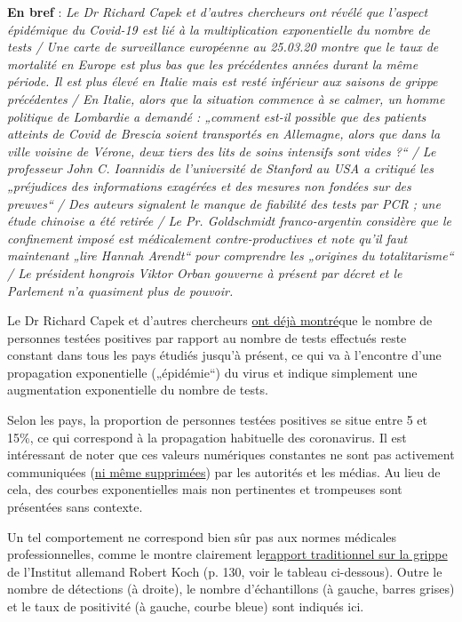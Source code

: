 \textbf{En bref} : \emph{Le Dr Richard Capek et d'autres chercheurs ont
révélé que l'aspect épidémique du Covid-19 est lié à la multiplication
exponentielle du nombre de tests / Une carte de surveillance européenne
au 25.03.20 montre que le taux de mortalité en Europe est plus bas que
les précédentes années durant la même période. Il est plus élevé en
Italie mais est resté inférieur aux saisons de grippe précédentes / En
Italie, alors que la situation commence à se calmer, un homme politique
de Lombardie a demandé : „comment est-il possible que des patients
atteints de Covid de Brescia soient transportés en Allemagne, alors que
dans la ville voisine de Vérone, deux tiers des lits de soins intensifs
sont vides ?`` / Le professeur John C. Ioannidis de l'université de
Stanford au USA a critiqué les „préjudices des informations exagérées et
des mesures non fondées sur des preuves`` / Des auteurs signalent le
manque de fiabilité des tests par PCR ; une étude chinoise a été retirée
/ Le Pr. Goldschmidt franco-argentin considère que le confinement imposé
est médicalement contre-productives et note qu'il faut maintenant „lire
Hannah Arendt`` pour comprendre les „origines du totalitarisme`` / Le
président hongrois Viktor Orban gouverne à présent par décret et le
Parlement n'a quasiment plus de pouvoir.}

Le Dr Richard Capek et d'autres chercheurs
\href{https://coronadaten.wordpress.com/}{ont déjà montré}que le nombre
de personnes testées positives par rapport au nombre de tests effectués
reste constant dans tous les pays étudiés jusqu'à présent, ce qui va à
l'encontre d'une propagation exponentielle („épidémie``) du virus et
indique simplement une augmentation exponentielle du nombre de tests.

Selon les pays, la proportion de personnes testées positives se situe
entre 5 et 15\%, ce qui correspond à la propagation habituelle des
coronavirus. Il est intéressant de noter que ces valeurs numériques
constantes ne sont pas activement communiquées
(\href{https://multipolar-magazin.de/artikel/coronavirus-irrefuhrung-fallzahlen}{ni
même supprimées}) par les autorités et les médias. Au lieu de cela, des
courbes exponentielles mais non pertinentes et trompeuses sont
présentées sans contexte.

Un tel comportement ne correspond bien sûr pas aux normes médicales
professionnelles, comme le montre clairement
le\href{https://influenza.rki.de/Saisonberichte/2017.pdf}{rapport
traditionnel sur la grippe} de l'Institut allemand Robert Koch (p. 130,
voir le tableau ci-dessous). Outre le nombre de détections (à droite),
le nombre d'échantillons (à gauche, barres grises) et le taux de
positivité (à gauche, courbe bleue) sont indiqués ici.

